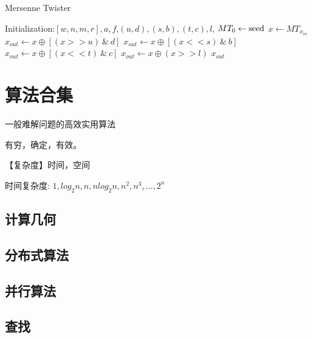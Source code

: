 \documentclass[UTF8]{../computerUniverse}
\begin{document}
      \begin{algorithm}[ht]
        \caption{Mersenne Twister}\label{algo:2ch001MersenneTwister}
        \SetAlgoLined
        Initialization:$[w, n, m, r], a, f$,$(u,d),(s,b),(t,c),l$, $MT_0 \leftarrow {\rm seed}$\;
        $x \leftarrow MT_{x_{in}}$\;
        $x_{out} \leftarrow x \oplus [ (x >> u) \ \& \  d]$\;
        $x_{out} \leftarrow x \oplus [ (x << s) \ \& \ b]$\;
        $x_{out} \leftarrow x \oplus [ (x << t) \ \& \  c]$\;
        $x_{out} \leftarrow x \oplus  (x >> l) $\;
        \KwRet $x_{out}$\;
      \end{algorithm}






\chapter{算法合集}
一般难解问题的高效实用算法

有穷，确定，有效。

【复杂度】时间，空间

时间复杂度: $1,log_2n,n,nlog_2n,n^2,n^3,...,2^n$




\section{计算几何}

\section{分布式算法}
\section{并行算法}





\section{查找}
\end{document}
